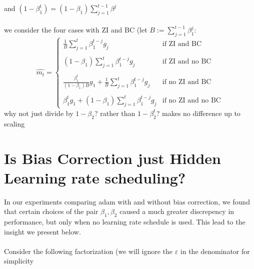 \documentclass[12pt]{book}
\begin{document}
and $(1 - \beta_1^{t}) = (1-\beta_1)\sum_{j=1}^{t-1} {\beta^{j}}$ \\
\\
we consider the four cases with ZI and BC (let $B := \sum_{j=1}^{t-1} {\beta_1^{j}}$:
\[
	\hat{m_t} = \begin{cases}
		\frac{1}{B}\sum_{j=1}^{t} {\beta_1^{t-j}g_j} \quad &\text{if ZI and BC}\\
		\\
	       (1-\beta_1)\sum_{j=1}^{t} {\beta_1^{t-j}g_j}  &\text{if ZI and no BC}\\
	       \\
             \frac{\beta_1^{t}}{(1-\beta_1)B}g_1 +  \frac{1}{B}\sum_{j=1}^{t} {\beta_1^{t-j}g_j}  						     &\text{if no ZI and BC}\\
	     \\
	\beta_1^{t}g_1 + (1-\beta_1)\sum_{j=1}^{t} {\beta_1^{t-j}g_j}   						     & \text{if no ZI and no BC}

\end{cases}
\] 
why not just divide by $1-\beta_2$? rather than $1-\beta_2^{t}$? makes no difference up to scaling


\section{Is Bias Correction just Hidden Learning rate scheduling?}
In our experiments comparing adam with and without bias correction, we found that certain choices of the pair $\beta_1, \beta_2$ caused a much greater discrepency in performance, but only when no learning rate schedule is used. This lead to the insight we present below. \\
\\
Consider the following factorization (we will ignore the $\varepsilon $ in the denominator for simplicity
\footnotemark{}
\end{document}
